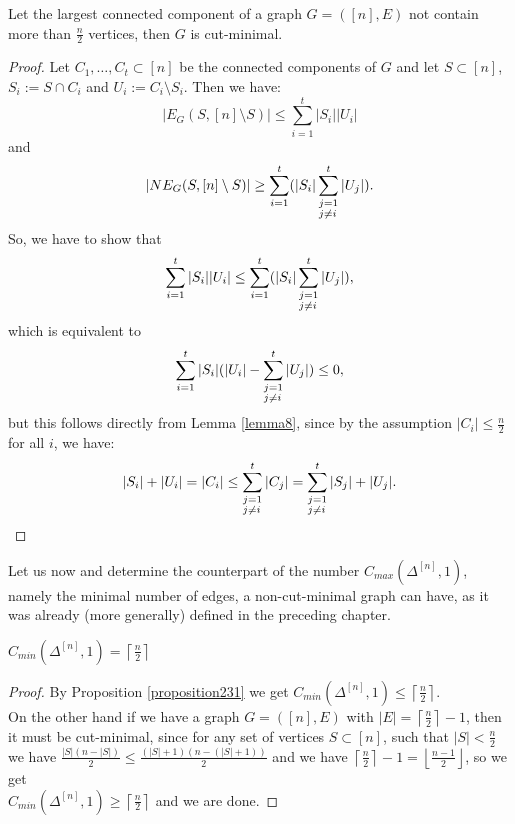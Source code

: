 \begin{prop}
Let the largest connected component of a graph \(G=([n],E)\) not contain more than \(\frac{n}{2}\) vertices, then \(G\) is cut-minimal.
\begin{proof}
Let \(C_1,\ldots,C_t\subset [n]\) be the connected components of \(G\) and let \(S\subset [n]\), \(S_i:=S\cap C_i\) and \(U_i:=C_i\setminus S_i\). Then we have:
\[
|E_G(S,[n]\setminus S)|\leq\sum\limits_{i=1}^t|S_i||U_i|
\] 
and
\[
|NE_G(S,[n]\setminus S)|\geq\sum\limits_{i=1}^t(|S_i|\sum_{\begin{subarray}{l}j=1\\ j\neq i\end{subarray}}^t|U_j|).
\]
So, we have to show that
\[
\sum\limits_{i=1}^t|S_i||U_i|\leq\sum\limits_{i=1}^t(|S_i|\sum_{\begin{subarray}{l}j=1\\ j\neq i\end{subarray}}^t|U_j|),
\]
which is equivalent to
\[
\sum\limits_{i=1}^t|S_i|(|U_i|-\sum_{\begin{subarray}{l}j=1\\ j\neq i\end{subarray}}^t|U_j|)\leq 0,
\]
but this follows directly from Lemma \ref{lemma8}, since by the assumption \(|C_i|\leq\frac{n}{2}\) for all \(i\), we have:
\[
|S_i|+|U_i|=|C_i|\leq\sum_{\begin{subarray}{l}j=1\\ j\neq i\end{subarray}}^t|C_j|=\sum_{\begin{subarray}{l}j=1\\ j\neq i\end{subarray}}^t|S_j|+|U_j|.
\]
\end{proof}
\end{prop}

Let us now and determine the counterpart of the number \(C_{max}(\Delta^{[n]},1)\), namely the minimal number of edges, a non-cut-minimal graph can have, as it was already (more generally) defined in the preceding chapter.

\begin{thm}\label{theorem2}
\(C_{min}(\Delta^{[n]},1)=\left\lceil\frac{n}{2}\right\rceil\)
\begin{proof}
By Proposition \ref{proposition231} we get \(C_{min}(\Delta^{[n]},1)\leq\left\lceil\frac{n}{2}\right\rceil\).\\
On the other hand if we have a graph \(G=([n],E)\) with \(|E|=\left\lceil\frac{n}{2}\right\rceil-1\), then it must be cut-minimal, since for any set of vertices \(S\subset[n]\), such that \(|S|<\frac{n}{2}\) we have \(\frac{|S|(n-|S|)}{2}\leq\frac{(|S|+1)(n-(|S|+1))}{2}\) and we have \(\left\lceil\frac{n}{2}\right\rceil-1=\left\lfloor\frac{n-1}{2}\right\rfloor\), so we get\\
\(C_{min}(\Delta^{[n]},1)\geq\left\lceil\frac{n}{2}\right\rceil\) and we are done.
\end{proof}
\end{thm}

